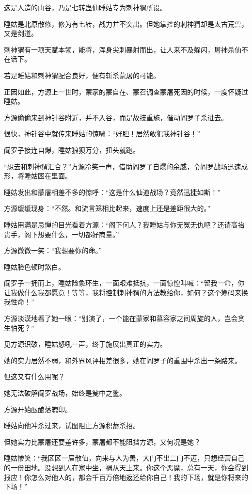 \begin{this_body}
这是人造的山谷，乃是七转蛊仙睡姑专为刺神猬所设。

睡姑是北原散修，修为有七转，战力并不突出。但她掌控的刺神猬却是太古荒兽，又是剑道。

刺神猬有一项天赋本领，能将，浑身尖刺暴射而出，让人来不及躲闪，屠神杀仙不在话下。

若是睡姑和刺神猬配合良好，便有斩杀蒙屠的可能。

正因如此，方源上一世时，蒙家的蒙自在、蒙召调查蒙屠死因的时候，一度怀疑过睡姑。

方源偷偷来到神针谷附近，并不入谷，而是故技重施，催动阎罗子杀进去。

很快，神针谷中就传来睡姑的惊啸：“好胆！居然敢犯我神针谷！”

阎罗子接连自爆，睡姑狼狈万分，扭头就跑。

“想去和刺神猬汇合？”方源冷笑一声，借助阎罗子自爆的余威，令阎罗战场迅速成形，将睡姑困在里面。

睡姑发出和蒙屠相差不多的惊呼：“这是什么仙道战场？竟然迅捷如斯！”

方源缓缓现身：“不然。和流言笼相比起来，速度上还是差距很大的。”

睡姑用满是忌惮的目光看着方源：“阁下何人？我睡姑与你无冤无仇吧？还请高抬贵手，阁下想要什么，一切都好商量。”

方源微微一笑：“我想要你的命。”

睡姑脸色顿时煞白。

阎罗子一拥而上，睡姑险象环生，一面艰难抵抗，一面惊惶叫喊：“留我一命，你让我做什么我都愿意！等等，我将控制刺神猬的方法教给你，如何？这个筹码来换我性命！”

方源淡漠地看了她一眼：“别演了，一个能在蒙家和慕容家之间周旋的人，岂会贪生怕死？”

见方源识破，睡姑怒吼一声，终于施展出真正的实力。

她的实力居然不弱，和外界风评相差很多，她在阎罗子的重围中杀出一条路来。

但这又有什么用呢？

她无法破解阎罗战场，始终是瓮中之鳖。

方源开始酝酿落魄印。

睡姑向他冲杀过来，试图阻止方源积蓄杀招。

但她实力比蒙屠还要差许多，蒙屠都不能阻挡方源，又何况是她？

睡姑惨笑：“我区区一届散仙，向来与人为善，大门不出二门不迈，只想经营自己的一份田地。没想到人在家中坐，祸从天上来。你这个恶魔，总有一天，你会得到报应！你怎么对他人的，都会千百万倍地返还给你自己！我的下场，就是你将来的下场！”


\end{this_body}
